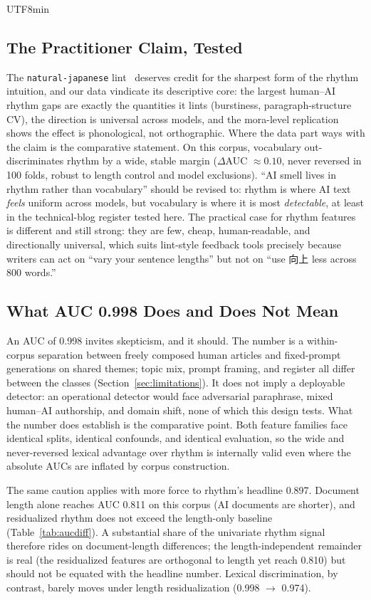 \documentclass[11pt,a4paper]{article}
\begin{document}
\begin{CJK}{UTF8}{min}
\subsection{The Practitioner Claim, Tested}

The \texttt{natural-japanese} lint~\citep{mizoguchi2026natural} deserves credit for the sharpest form of the rhythm intuition, and our data vindicate its descriptive core: the largest human--AI rhythm gaps are exactly the quantities it lints (burstiness, paragraph-structure CV), the direction is universal across models, and the mora-level replication shows the effect is phonological, not orthographic. Where the data part ways with the claim is the comparative statement. On this corpus, vocabulary out-discriminates rhythm by a wide, stable margin ($\Delta$AUC $\approx 0.10$, never reversed in 100 folds, robust to length control and model exclusions). ``AI smell lives in rhythm rather than vocabulary'' should be revised to: rhythm is where AI text \emph{feels} uniform across models, but vocabulary is where it is most \emph{detectable}, at least in the technical-blog register tested here. The practical case for rhythm features is different and still strong: they are few, cheap, human-readable, and directionally universal, which suits lint-style feedback tools precisely because writers can act on ``vary your sentence lengths'' but not on ``use 向上 less across 800 words.''

\subsection{What AUC 0.998 Does and Does Not Mean}

An AUC of 0.998 invites skepticism, and it should. The number is a within-corpus separation between freely composed human articles and fixed-prompt generations on shared themes; topic mix, prompt framing, and register all differ between the classes (Section~\ref{sec:limitations}). It does not imply a deployable detector: an operational detector would face adversarial paraphrase, mixed human--AI authorship, and domain shift, none of which this design tests. What the number does establish is the comparative point. Both feature families face identical splits, identical confounds, and identical evaluation, so the wide and never-reversed lexical advantage over rhythm is internally valid even where the absolute AUCs are inflated by corpus construction.

The same caution applies with more force to rhythm's headline 0.897. Document length alone reaches AUC 0.811 on this corpus (AI documents are shorter), and residualized rhythm does not exceed the length-only baseline (Table~\ref{tab:aucdiff}). A substantial share of the univariate rhythm signal therefore rides on document-length differences; the length-independent remainder is real (the residualized features are orthogonal to length yet reach 0.810) but should not be equated with the headline number. Lexical discrimination, by contrast, barely moves under length residualization (0.998 $\to$ 0.974).


\end{CJK}
\end{document}
